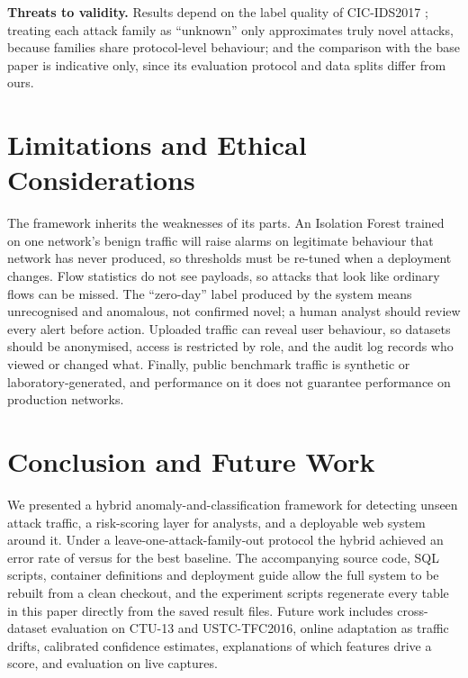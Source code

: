\documentclass[conference]{IEEEtran}
\newcommand{\hybErr}{}\newcommand{\hybFscore}{}\newcommand{\hybPrec}{}\newcommand{\hybRec}{}\newcommand{\hybAcc}{}
\begin{document}

\textbf{Threats to validity.} Results depend on the label quality of CIC-IDS2017 \cite{engelen2021troubleshooting}; treating each attack family as ``unknown'' only approximates truly novel attacks, because families share protocol-level behaviour; and the comparison with the base paper is indicative only, since its evaluation protocol and data splits differ from ours.

\section{Limitations and Ethical Considerations}
The framework inherits the weaknesses of its parts. An Isolation Forest trained on one network's benign traffic will raise alarms on legitimate behaviour that network has never produced, so thresholds must be re-tuned when a deployment changes. Flow statistics do not see payloads, so attacks that look like ordinary flows can be missed. The ``zero-day'' label produced by the system means unrecognised and anomalous, not confirmed novel; a human analyst should review every alert before action. Uploaded traffic can reveal user behaviour, so datasets should be anonymised, access is restricted by role, and the audit log records who viewed or changed what. Finally, public benchmark traffic is synthetic or laboratory-generated, and performance on it does not guarantee performance on production networks.

\section{Conclusion and Future Work}
We presented a hybrid anomaly-and-classification framework for detecting unseen attack traffic, a risk-scoring layer for analysts, and a deployable web system around it. Under a leave-one-attack-family-out protocol the hybrid achieved an error rate of \hybErr{} versus \bestBaseErr{} for the best baseline. The accompanying source code, SQL scripts, container definitions and deployment guide allow the full system to be rebuilt from a clean checkout, and the experiment scripts regenerate every table in this paper directly from the saved result files. Future work includes cross-dataset evaluation on CTU-13 and USTC-TFC2016, online adaptation as traffic drifts, calibrated confidence estimates, explanations of which features drive a score, and evaluation on live captures.



\end{document}
